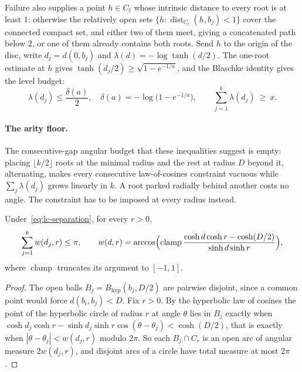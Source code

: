 Failure also supplies a point $h\in C_t$ whose intrinsic distance to every
root is at least $1$: otherwise the relatively open sets
$\{h:\operatorname{dist}_{C_t}(h,b_j)<1\}$ cover the connected compact set,
and either two of them meet, giving a concatenated path below $2$, or one of
them already contains both roots.  Send $h$ to the origin of the disc, write
$d_j=d(0,b_j)$ and $\lambda(d)=-\log\tanh(d/2)$.  The one-root estimate at $h$
gives $\tanh(d_j/2)\ge\sqrt{1-e^{-1/a}}$, and the Blaschke identity gives the
level budget:
\begin{equation}\label{eq:lc-radius-and-budget}
 \lambda(d_j)\le\frac{\delta(a)}2,\quad
 \delta(a)=-\log\bigl(1-e^{-1/a}\bigr),
 \qquad
 \sum_{j=1}^{k}\lambda(d_j)\ \ge\ x .
\end{equation}

\paragraph{The arity floor.}
The consecutive-gap angular budget that these inequalities suggest is empty:
placing $\lfloor k/2\rfloor$ roots at the minimal radius and the rest at
radius $D$ beyond it, alternating, makes every consecutive law-of-cosines
constraint vacuous while $\sum_j\lambda(d_j)$ grows linearly in $k$.  A root
parked radially behind another costs no angle.  The constraint has to be
imposed at every radius instead.

\begin{lemma}\label{res:circle-slice-packing}
Under~\eqref{eq:lc-separation}, for every $r>0$,
\[
 \sum_{j=1}^{k}w(d_j,r)\le\pi,\qquad
 w(d,r)=\arccos\Bigl(\operatorname{clamp}
   \frac{\cosh d\cosh r-\cosh(D/2)}{\sinh d\sinh r}\Bigr),
\]
where $\operatorname{clamp}$ truncates its argument to $[-1,1]$.
\end{lemma}

\begin{proof}
The open balls $B_j=B_{\mathrm{hyp}}(b_j,D/2)$ are pairwise disjoint, since a
common point would force $d(b_i,b_j)<D$.  Fix $r>0$.  By the hyperbolic law of
cosines the point of the hyperbolic circle of radius $r$ at angle $\theta$
lies in $B_j$ exactly when
$\cosh d_j\cosh r-\sinh d_j\sinh r\cos(\theta-\theta_j)<\cosh(D/2)$, that is
exactly when $|\theta-\theta_j|<w(d_j,r)$ modulo $2\pi$.  So each
$B_j\cap C_r$ is an open arc of angular measure $2w(d_j,r)$, and disjoint arcs
of a circle have total measure at most $2\pi$.
\end{proof}

